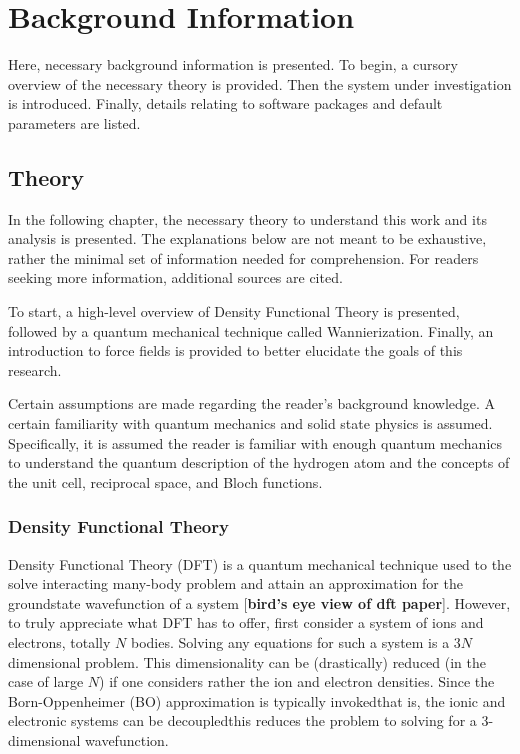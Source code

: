 \chapter{Background Information}   

Here, necessary background information is presented. To begin, a cursory overview of the necessary theory is provided. Then the system under investigation is introduced. Finally, details relating to software packages and default parameters are listed.
    
    \section{Theory}
    
    In the following chapter, the necessary theory to understand this work and its analysis is presented. The explanations below are not meant to be exhaustive, rather the minimal set of information needed for comprehension. For readers seeking more information, additional sources are cited.
    
    To start, a high-level overview of Density Functional Theory is presented, followed by a quantum mechanical technique called Wannierization. Finally, an introduction to force fields is provided to better elucidate the goals of this research.
    
    Certain assumptions are made regarding the reader's background knowledge. A certain familiarity with quantum mechanics and solid state physics is assumed. Specifically, it is assumed the reader is familiar with enough quantum mechanics to understand the quantum description of the hydrogen atom and the concepts of the unit cell, reciprocal space, and Bloch functions. 
    
    \subsection{Density Functional Theory}
    
    Density Functional Theory (DFT) is a quantum mechanical technique used to the solve interacting many-body problem and attain an approximation for the groundstate wavefunction of a system [\textbf{bird's eye view of dft paper}]. However, to truly appreciate what DFT has to offer, first consider a system of ions and electrons, totally $N$ bodies. Solving any equations for such a system is a $3N$ dimensional problem. This dimensionality can be (drastically) reduced (in the case of large $N$) if one considers rather the ion and electron densities. Since the Born-Oppenheimer (BO) approximation is typically invoked\textemdash that is, the ionic and electronic systems can be decoupled\textemdash this reduces the problem to solving for a 3-dimensional wavefunction.
    
